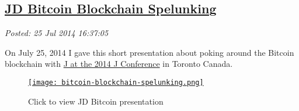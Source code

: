%

\subsection*{\href{https://bakerjd99.wordpress.com/2014/07/25/jd-bitcoin-blockchain-spelunking/}{JD Bitcoin Blockchain Spelunking}}


\noindent\emph{Posted: 25 Jul 2014 16:37:05}
\vspace{6pt}

On July 25, 2014 I gave this short presentation about poking around the
Bitcoin blockchain with \href{https://www.jsoftware.com/jwiki/Community/Conference2014}{J at the
2014 J Conference} in Toronto Canada.



\captionsetup[figure]{labelformat=empty}


\begin{figure}[htbp]
\centering
\href{https://github.com/bakerjd99/jacks/blob/master/bitcoin/JD-Bitcoin-Blockchain-Spelunking.pdf}{\texttt{[image: bitcoin-blockchain-spelunking.png]}}
\caption{Click to view JD Bitcoin presentation}
\label{fig:4793X0}
\end{figure}


%